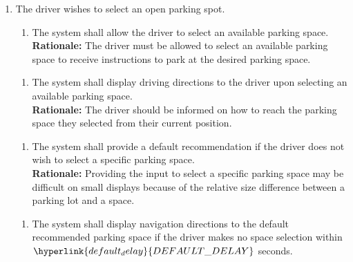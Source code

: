 \documentclass[12pt,letterpaper]{article}
\newcounter{businesseventnum}
\newcounter{funcreqnum}
\begin{document}
\begin{enumerate}[{BE}\thebusinesseventnum.] 
\item The driver wishes to select an open parking spot.
\begin{enumerate}[{FR}\thefuncreqnum.] 
    \item The system shall allow the driver to select an available parking space.\\
    \textbf{Rationale:} The driver must be allowed to select an available parking space to receive instructions to park at the desired parking space.
\end{enumerate}

\begin{enumerate}[{FR}\thefuncreqnum.] 
    \item The system shall display driving directions to the driver upon selecting an available parking space.\\
    \textbf{Rationale:} The driver should be informed on how to reach the parking space they selected from their current position.
\end{enumerate}

\begin{enumerate}[{FR}\thefuncreqnum.] 
    \item The system shall provide a default recommendation if the driver does not wish to select a specific parking space. \label{poc3}\\
    \textbf{Rationale:} Providing the input to select a specific parking space may be difficult on small displays because of the relative size difference between a parking lot and a space.
\end{enumerate}

\begin{enumerate}[{FR}\thefuncreqnum.] 
    \item The system shall display navigation directions to the default recommended parking space if the driver makes no space selection within $\hyperlink{default_delay}{DEFAULT\_DELAY}$ seconds.
\end{enumerate}
\end{enumerate}
\end{document}
